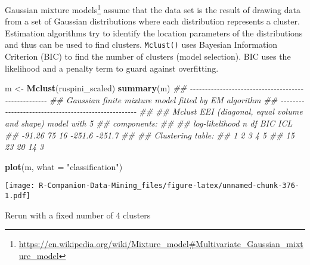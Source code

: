 \documentclass[
  notitlepage]{book}
\newenvironment{Shaded}{\begin{snugshade}}{\end{snugshade}}
\newcommand{\CommentTok}[1]{\textcolor[rgb]{0.56,0.35,0.01}{\textit{#1}}}
\newcommand{\DataTypeTok}[1]{\textcolor[rgb]{0.13,0.29,0.53}{#1}}
\newcommand{\KeywordTok}[1]{\textcolor[rgb]{0.13,0.29,0.53}{\textbf{#1}}}
\newcommand{\NormalTok}[1]{#1}
\newcommand{\StringTok}[1]{\textcolor[rgb]{0.31,0.60,0.02}{#1}}
\DeclareRobustCommand{\href}[2]{#2\footnote{\url{#1}}}
\begin{document}
\href{https://en.wikipedia.org/wiki/Mixture_model\#Multivariate_Gaussian_mixture_model}{Gaussian mixture
models}
assume that the data set is the result of drawing data from a set of
Gaussian distributions where each distribution represents a cluster.
Estimation algorithms try to identify the location parameters of the
distributions and thus can be used to find clusters. \texttt{Mclust()} uses
Bayesian Information Criterion (BIC) to find the number of clusters
(model selection). BIC uses the likelihood and a penalty term to guard
against overfitting.

\begin{Shaded}
\begin{Highlighting}[]
\NormalTok{m \textless{}{-}}\StringTok{ }\KeywordTok{Mclust}\NormalTok{(ruspini\_scaled)}
\KeywordTok{summary}\NormalTok{(m)}
\CommentTok{\#\# {-}{-}{-}{-}{-}{-}{-}{-}{-}{-}{-}{-}{-}{-}{-}{-}{-}{-}{-}{-}{-}{-}{-}{-}{-}{-}{-}{-}{-}{-}{-}{-}{-}{-}{-}{-}{-}{-}{-}{-}{-}{-}{-}{-}{-}{-}{-}{-}{-}{-}{-}{-} }
\CommentTok{\#\# Gaussian finite mixture model fitted by EM algorithm }
\CommentTok{\#\# {-}{-}{-}{-}{-}{-}{-}{-}{-}{-}{-}{-}{-}{-}{-}{-}{-}{-}{-}{-}{-}{-}{-}{-}{-}{-}{-}{-}{-}{-}{-}{-}{-}{-}{-}{-}{-}{-}{-}{-}{-}{-}{-}{-}{-}{-}{-}{-}{-}{-}{-}{-} }
\CommentTok{\#\# }
\CommentTok{\#\# Mclust EEI (diagonal, equal volume and shape) model with 5}
\CommentTok{\#\# components: }
\CommentTok{\#\# }
\CommentTok{\#\#  log{-}likelihood  n df    BIC    ICL}
\CommentTok{\#\#          {-}91.26 75 16 {-}251.6 {-}251.7}
\CommentTok{\#\# }
\CommentTok{\#\# Clustering table:}
\CommentTok{\#\#  1  2  3  4  5 }
\CommentTok{\#\# 15 23 20 14  3}
\end{Highlighting}
\end{Shaded}

\begin{Shaded}
\begin{Highlighting}[]
\KeywordTok{plot}\NormalTok{(m, }\DataTypeTok{what =} \StringTok{"classification"}\NormalTok{)}
\end{Highlighting}
\end{Shaded}

\texttt{[image: R-Companion-Data-Mining\_files/figure-latex/unnamed-chunk-376-1.pdf]}

Rerun with a fixed number of 4 clusters
\end{document}
